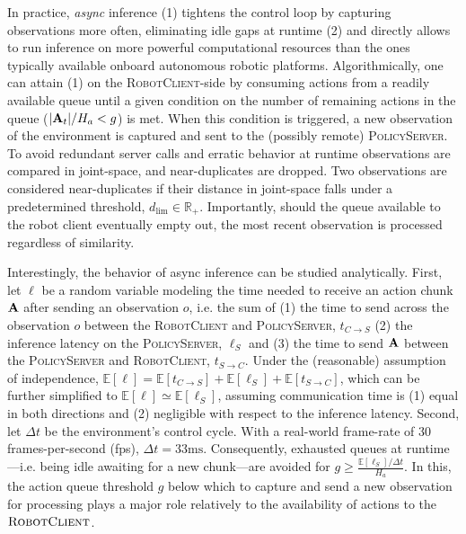 In practice, \emph{async} inference (1) tightens the control loop by capturing observations more often, eliminating idle gaps at runtime (2) and directly allows to run inference on more powerful computational resources than the ones typically available onboard autonomous robotic platforms.
Algorithmically, one can attain (1) on the \textsc{RobotClient}-side by consuming actions from a readily available queue until a given condition on the number of remaining actions in the queue (\(\vert \mathbf{A}_t \vert / H_a < g \)) is met. When this condition is triggered, a new observation of the environment is captured and sent to the (possibly remote) \textsc{PolicyServer}. 
To avoid redundant server calls and erratic behavior at runtime observations are compared in joint-space, and near-duplicates are dropped.
Two observations are considered near-duplicates if their distance in joint-space falls under a predetermined threshold, \( d_{\text{lim}} \in \mathbb R_+\).
Importantly, should the queue available to the robot client eventually empty out, the most recent observation is processed regardless of similarity.

Interestingly, the behavior of async inference can be studied analytically. First, let \( \ell \) be a random variable modeling the time needed to receive an action chunk \( \mathbf{A} \) after sending an observation \( o \), i.e. the sum of (1) the time to send across the observation \( o \) between the \textsc{RobotClient} and \textsc{PolicyServer}, \( t_{C \to S}\) (2) the inference latency on the \textsc{PolicyServer}, \( \ell_S \) and (3) the time to send \( \mathbf{A} \) between the \textsc{PolicyServer} and \textsc{RobotClient}, \( t_{S \to C} \). Under the (reasonable) assumption of independence, \( \mathbb E [\ell] = \mathbb E[t_{C \to S}] + \mathbb E[\ell_S] + \mathbb E[t_{S \to C}] \), which can be further simplified to \( \mathbb E[\ell] \simeq \mathbb E[\ell_S]  \), assuming communication time is (1) equal in both directions and (2) negligible with respect to the inference latency. Second, let \(\Delta t\) be the environment's control cycle. With a real-world frame-rate of 30 frames-per-second (fps), \(\Delta t=33\text{ms}\). Consequently, exhausted queues at runtime---i.e. being idle awaiting for a new chunk---are avoided for \( g \geq \frac{\mathbb E[\ell_S] / \Delta t}{H_a} \). In this, the action queue threshold \( g \) below which to capture and send a new observation for processing plays a major role relatively to the availability of actions to the \( \textsc{RobotClient} \).

